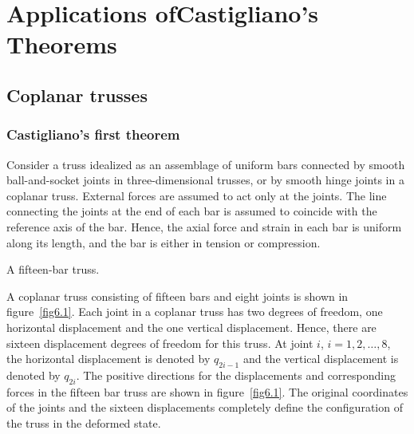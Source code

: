 \documentclass{AeroStructure-ERJohnson}
\begin{document}
\mainmatter

\setcounter{page}{143}
\setcounter{chapter}{5}

\chapter{Applications of\break Castigliano's Theorems}\label{ch6}

\section{Coplanar trusses}\label{sec6.1}
\subsection{Castigliano’s first theorem}\label{sec6.1.1}

Consider a truss idealized as an assemblage of uniform bars connected by smooth ball-and-socket joints in three-dimensional trusses, or by smooth hinge joints in a coplanar truss. External forces are assumed to act only at the joints. The line connecting the joints at the end of each bar is assumed to coincide with the reference axis of the bar. Hence, the axial force and strain in each bar is uniform along its length, and the bar is either in tension or compression.


{\caption{A fifteen-bar truss.}\label{fig6.1}}

A coplanar truss consisting of fifteen bars and eight joints is shown in figure~\ref{fig6.1}. Each joint in a coplanar truss has two degrees of freedom, one horizontal displacement and the one vertical displacement. Hence, there are sixteen displacement degrees of freedom for this truss. At joint $i$, $i=1, 2,\ldots,8$, the horizontal displacement is denoted by $q_{2 i-1}$ and the vertical displacement is denoted by $q_{2 i}$. The positive directions for the displacements and corresponding forces in the fifteen bar truss are shown in figure~\ref{fig6.1}. The original coordinates of the joints and the sixteen displacements completely define the configuration of the truss in the deformed state.
\end{document}
